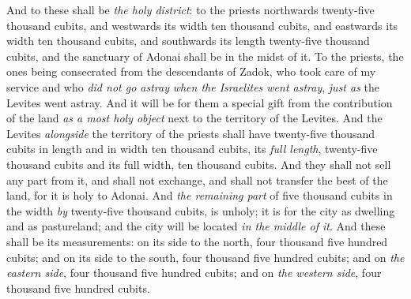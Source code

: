 \begin{biblechapter}
\verse And to these shall be \textit{the holy district}: to the priests northwards twenty-five thousand cubits, and westwards its width ten thousand cubits, and eastwards its width ten thousand cubits, and southwards its length twenty-five thousand cubits, and the sanctuary of Adonai shall be in the midst of it.
\verse To the priests, the ones being consecrated from the descendants of Zadok, who took care of my service and who \textit{did not go astray} \textit{when the Israelites went astray}, \textit{just as} the Levites went astray.
\verse And it will be for them a special gift from the contribution of the land \textit{as a most holy object} next to the territory of the Levites.
\verse And the Levites \textit{alongside} the territory of the priests shall have twenty-five thousand cubits in length and in width ten thousand cubits, its \textit{full length}, twenty-five thousand cubits and its full width, ten thousand cubits.
\verse And they shall not sell any part from it, and shall not exchange, and shall not transfer the best of the land, for it is holy to Adonai.
\verse And \textit{the remaining part} of five thousand cubits in the width \textit{by} twenty-five thousand cubits, is unholy; it is for the city as dwelling and as pastureland; and the city will be located \textit{in the middle of it}.
\verse And these shall be its measurements: on its side to the north, four thousand five hundred cubits; and on its side to the south, four thousand five hundred cubits; and on \textit{the eastern side}, four thousand five hundred cubits; and on \textit{the western side}, four thousand five hundred cubits.

\end{biblechapter}
